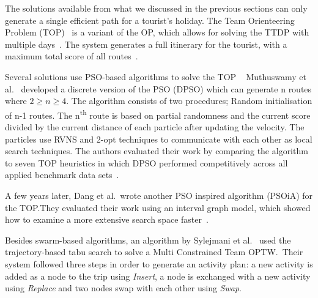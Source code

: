 The solutions available from what we discussed in the previous sections can only
generate a single efficient path for a tourist's holiday. The Team Orienteering
Problem (TOP)~\cite{Chao1996} is a variant of the OP, which allows for
solving the TTDP with multiple days~\cite{Sylejmani2017}. The system generates a full
itinerary for the tourist, with a maximum total score of all routes~\cite{Herzog2020}.

Several solutions use PSO-based algorithms to solve the TOP
~\cite{Muthuswamy2011,Wisittipanich2020,Yu2019}
Muthuswamy et al.~\cite{Muthuswamy2011} developed a discrete version of the PSO (DPSO)
which can generate n routes where $2 \geq n \geq 4$. The algorithm consists of two procedures;
Random initialisation of n-1 routes. The n\textsuperscript{th}
route is based on partial randomness and the current score divided by the current
distance of each particle after updating the velocity.  The
particles use RVNS and 2-opt techniques to communicate with each other as local
search techniques. The authors evaluated their work by comparing the algorithm
to seven TOP heuristics in which DPSO performed competitively across all
applied benchmark data sets~\cite{Gavalas2014a}.

A few years later, Dang et al.\ wrote another PSO inspired algorithm (PSOiA) for
the TOP.\@ They evaluated their work using an interval graph model, which showed
how to examine a more extensive search space faster~\cite{Gunawan2016}.

Besides swarm-based algorithms, an algorithm by Sylejmani et al.~\cite{Sylejmani2012}
used the trajectory-based tabu search to solve a Multi Constrained Team OPTW.\
Their system followed three steps in order to generate an activity plan: a new
activity is added as a node to the trip using \emph{Insert}, a node is
exchanged with a new activity using \emph{Replace} and two nodes swap with each
other using \emph{Swap}. 



